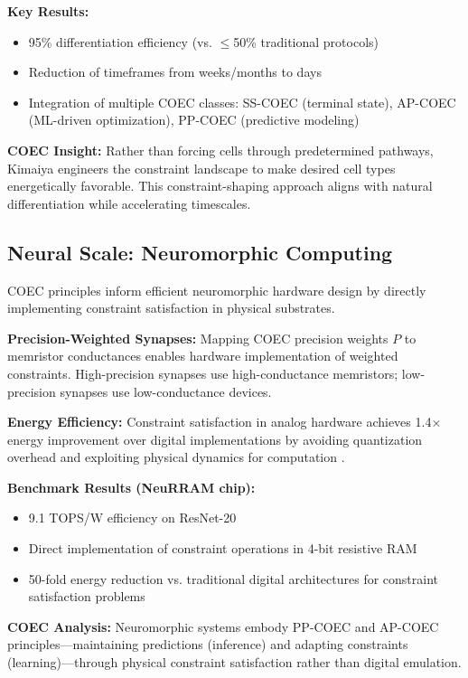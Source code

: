 \documentclass[11pt]{article}
\begin{document}
\textbf{Key Results:}
\begin{itemize}
\item 95\% differentiation efficiency (vs. $\leq$50\% traditional protocols)
\item Reduction of timeframes from weeks/months to days
\item Integration of multiple COEC classes: SS-COEC (terminal state), AP-COEC (ML-driven optimization), PP-COEC (predictive modeling)
\end{itemize}

\textbf{COEC Insight:} Rather than forcing cells through predetermined pathways, Kimaiya engineers the constraint landscape to make desired cell types energetically favorable. This constraint-shaping approach aligns with natural differentiation while accelerating timescales.

\subsection{Neural Scale: Neuromorphic Computing}

COEC principles inform efficient neuromorphic hardware design by directly implementing constraint satisfaction in physical substrates.

\textbf{Precision-Weighted Synapses:} Mapping COEC precision weights $P$ to memristor conductances enables hardware implementation of weighted constraints. High-precision synapses use high-conductance memristors; low-precision synapses use low-conductance devices.

\textbf{Energy Efficiency:} Constraint satisfaction in analog hardware achieves 1.4× energy improvement over digital implementations by avoiding quantization overhead and exploiting physical dynamics for computation \citep{ielmini2018memory}.

\textbf{Benchmark Results (NeuRRAM chip):}
\begin{itemize}
\item 9.1 TOPS/W efficiency on ResNet-20
\item Direct implementation of constraint operations in 4-bit resistive RAM
\item 50-fold energy reduction vs. traditional digital architectures for constraint satisfaction problems
\end{itemize}

\textbf{COEC Analysis:} Neuromorphic systems embody PP-COEC and AP-COEC principles—maintaining predictions (inference) and adapting constraints (learning)—through physical constraint satisfaction rather than digital emulation.
\end{document}

